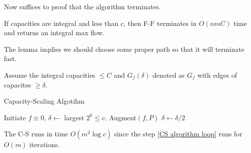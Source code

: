 Now suffices to proof that the algorithm terminates.

\begin{lemma}
    If capacities are integral and less than  $ c $, then F-F terminates in  $ O(nmC) $ time and returns an integral max flow.  
\end{lemma}

The lemma implies we should choose some proper path so that it will terminate fast.

Assume the integral capacities  $  \leq C $ and  $ G_f(\delta) $ denoted as  $ G_f $ with edges of capacites  $  \geq \delta $.    
\begin{algorithm}
    \caption{Capacity-Scaling Algotihm}
    \begin{algorithmic}[1]
        \STATE Initiate  $ f\equiv 0 $,  $ \delta\leftarrow  $ largest  $ 2^k \leq c $.  
        \label{CS algorithm loop}
                \STATE Augment$ (f,P) $
            \ENDWHILE
            \STATE $ \delta\leftarrow \delta/2 $ 
        \ENDWHILE
    \end{algorithmic}
\end{algorithm}

\begin{theorem}
    The C-S runs in time  $ O(m^2\log c) $ since the step \ref{CS algorithm loop} runs for  $ O(m) $ iterations. 
\end{theorem}